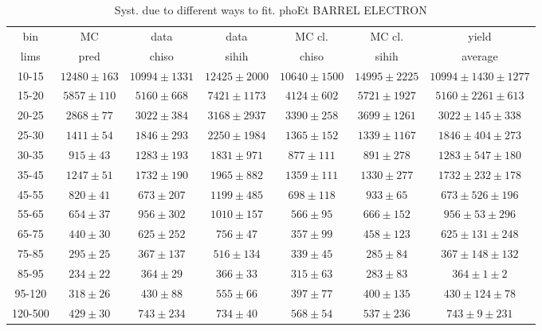 \begin{table}[h]
  \tiny
  \begin{center}
  \caption{Syst. due to different ways to fit. phoEt BARREL ELECTRON}
  \begin{tabular}{|c|c|c|c|c|c|c|}
    bin &  MC   & data  & data  & MC cl. & MC cl. & yield \\ 
    lims & pred & chiso & sihih & chiso  & sihih  & average \\ \hline
    10-15 & $12480\pm163$ & $10994\pm1331$ & $12425\pm2000$ & $10640\pm1500$ & $14995\pm2225$ &$10994\pm1430\pm1277$  \\ \hline
    15-20 & $5857\pm110$ & $5160\pm668$ & $7421\pm1173$ & $4124\pm602$ & $5721\pm1927$ &$5160\pm2261\pm613$  \\ \hline
    20-25 & $2868\pm77$ & $3022\pm384$ & $3168\pm2937$ & $3390\pm258$ & $3699\pm1261$ &$3022\pm145\pm338$  \\ \hline
    25-30 & $1411\pm54$ & $1846\pm293$ & $2250\pm1984$ & $1365\pm152$ & $1339\pm1167$ &$1846\pm404\pm273$  \\ \hline
    30-35 & $915\pm43$ & $1283\pm193$ & $1831\pm971$ & $877\pm111$ & $891\pm278$ &$1283\pm547\pm180$  \\ \hline
    35-45 & $1247\pm51$ & $1732\pm190$ & $1965\pm882$ & $1359\pm111$ & $1330\pm277$ &$1732\pm232\pm178$  \\ \hline
    45-55 & $820\pm41$ & $673\pm207$ & $1199\pm485$ & $698\pm118$ & $933\pm65$ &$673\pm526\pm196$  \\ \hline
    55-65 & $654\pm37$ & $956\pm302$ & $1010\pm157$ & $566\pm95$ & $666\pm152$ &$956\pm53\pm296$  \\ \hline
    65-75 & $440\pm30$ & $625\pm252$ & $756\pm47$ & $357\pm99$ & $458\pm123$ &$625\pm131\pm248$  \\ \hline
    75-85 & $295\pm25$ & $367\pm137$ & $516\pm134$ & $339\pm45$ & $285\pm84$ &$367\pm148\pm132$  \\ \hline
    85-95 & $234\pm22$ & $364\pm29$ & $366\pm33$ & $315\pm63$ & $283\pm83$ &$364\pm1\pm2$  \\ \hline
    95-120 & $318\pm26$ & $430\pm88$ & $555\pm66$ & $397\pm77$ & $400\pm135$ &$430\pm124\pm78$  \\ \hline
    120-500 & $429\pm30$ & $743\pm234$ & $734\pm40$ & $568\pm54$ & $537\pm236$ &$743\pm9\pm231$  \\ \hline
  \end{tabular}
  \label{tab:diff_ways_to_fit_phoEt_BARREL_electron}
  \end{center}
\end{table}

